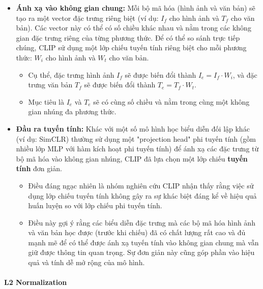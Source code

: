 \begin{enumerate}
    \begin{itemize}
        \item \textbf{Ánh xạ vào không gian chung:} Mỗi bộ mã hóa (hình ảnh và văn bản) sẽ tạo ra một vector đặc trưng riêng biệt (ví dụ: $I_f$ cho hình ảnh và $T_f$ cho văn bản). Các vector này có thể có số chiều khác nhau và nằm trong các không gian đặc trưng riêng của từng phương thức. Để có thể so sánh trực tiếp chúng, CLIP sử dụng một lớp chiếu tuyến tính riêng biệt cho mỗi phương thức: $W_i$ cho hình ảnh và $W_t$ cho văn bản.
        \begin{itemize}
            \item Cụ thể, đặc trưng hình ảnh $I_f$ sẽ được biến đổi thành $I_e = I_f \cdot W_i$, và đặc trưng văn bản $T_f$ sẽ được biến đổi thành $T_e = T_f \cdot W_t$.
            \item Mục tiêu là $I_e$ và $T_e$ sẽ có cùng số chiều và nằm trong cùng một không gian nhúng đa phương thức.
        \end{itemize}
        \item \textbf{Đầu ra tuyến tính:} Khác với một số mô hình học biểu diễn đối lập khác (ví dụ: SimCLR) thường sử dụng một "projection head" phi tuyến tính (gồm nhiều lớp MLP với hàm kích hoạt phi tuyến tính) để ánh xạ các đặc trưng từ bộ mã hóa vào không gian nhúng, CLIP đã lựa chọn một lớp chiếu \textbf{tuyến tính} đơn giản.
        \begin{itemize}
            \item Điều đáng ngạc nhiên là nhóm nghiên cứu CLIP nhận thấy rằng việc sử dụng lớp chiếu tuyến tính không gây ra sự khác biệt đáng kể về hiệu quả huấn luyện so với lớp chiếu phi tuyến tính.
            \item Điều này gợi ý rằng các biểu diễn đặc trưng mà các bộ mã hóa hình ảnh và văn bản học được (trước khi chiếu) đã có chất lượng rất cao và đủ mạnh mẽ để có thể được ánh xạ tuyến tính vào không gian chung mà vẫn giữ được thông tin quan trọng. Sự đơn giản này cũng góp phần vào hiệu quả và tính dễ mở rộng của mô hình.
        \end{itemize}
    \end{itemize}

    \paragraph{L2 Normalization}


\end{enumerate}
